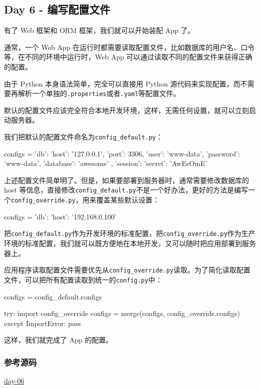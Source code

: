 \hypertarget{day-6---ux7f16ux5199ux914dux7f6eux6587ux4ef6}{%
\subsection{Day 6 -
编写配置文件}\label{day-6---ux7f16ux5199ux914dux7f6eux6587ux4ef6}}

有了 Web 框架和 ORM 框架，我们就可以开始装配 App 了。

通常，一个 Web App
在运行时都需要读取配置文件，比如数据库的用户名、口令等，在不同的环境中运行时，Web
App 可以通过读取不同的配置文件来获得正确的配置。

由于 Python 本身语法简单，完全可以直接用 Python
源代码来实现配置，而不需要再解析一个单独的\texttt{.properties}或者\texttt{.yaml}等配置文件。

默认的配置文件应该完全符合本地开发环境，这样，无需任何设置，就可以立刻启动服务器。

我们把默认的配置文件命名为\texttt{config\_default.py}：

\begin{pythoncode}
configs = {
    'db': {
        'host': '127.0.0.1',
        'port': 3306,
        'user': 'www-data',
        'password': 'www-data',
        'database': 'awesome'
    },
    'session': {
        'secret': 'AwEsOmE'
    }
}
\end{pythoncode}

上述配置文件简单明了。但是，如果要部署到服务器时，通常需要修改数据库的
host
等信息，直接修改\texttt{config\_default.py}不是一个好办法，更好的方法是编写一个\texttt{config\_override.py}，用来覆盖某些默认设置：

\begin{pythoncode}
configs = {
    'db': {
        'host': '192.168.0.100'
    }
}
\end{pythoncode}

把\texttt{config\_default.py}作为开发环境的标准配置，把\texttt{config\_override.py}作为生产环境的标准配置，我们就可以既方便地在本地开发，又可以随时把应用部署到服务器上。

应用程序读取配置文件需要优先从\texttt{config\_override.py}读取。为了简化读取配置文件，可以把所有配置读取到统一的\texttt{config.py}中：

\begin{pythoncode}
configs = config_default.configs

try:
    import config_override
    configs = merge(configs, config_override.configs)
except ImportError:
    pass
\end{pythoncode}

这样，我们就完成了 App 的配置。

\hypertarget{ux53c2ux8003ux6e90ux7801}{%
\subsubsection{参考源码}\label{ux53c2ux8003ux6e90ux7801}}

\href{https://github.com/michaelliao/awesome-python3-webapp/tree/day-06}{day-06}

